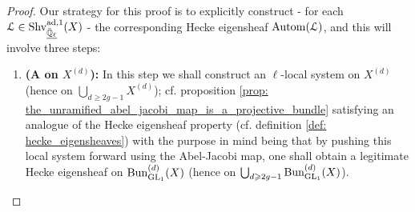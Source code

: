             \begin{proof}
                Our strategy for this proof is to explicitly construct - for each $\mathcal{L} \in \mathrm{Shv}_{\underline{\bar{\mathbb{Q}}_{\ell}}}^{\mathrm{ad}, 1}(X)$ - the corresponding Hecke eigensheaf $\mathrm{Autom}(\mathcal{L})$, and this will involve three steps:
                    \begin{enumerate}
                        \item \textbf{(A  on $X^{(d)}$):} In this step we shall construct an $\ell$-local system on $X^{(d)}$ (hence on $\bigcup_{d \geq 2g - 1} X^{(d)}$); cf. proposition \ref{prop: the_unramified_abel_jacobi_map_is_a_projective_bundle} satisfying an analogue of the Hecke eigensheaf property (cf. definition \ref{def: hecke_eigensheaves}) with the purpose in mind being that by pushing this local system forward using the Abel-Jacobi map, one shall obtain a legitimate Hecke eigensheaf on $\mathrm{Bun}_{\operatorname{GL}_1}^{(d)}(X)$ (hence on $\bigcup_{d \geqslant 2g - 1} \mathrm{Bun}_{\operatorname{GL}_1}^{(d)}(X)$).
                        

\end{enumerate}
\end{proof}
